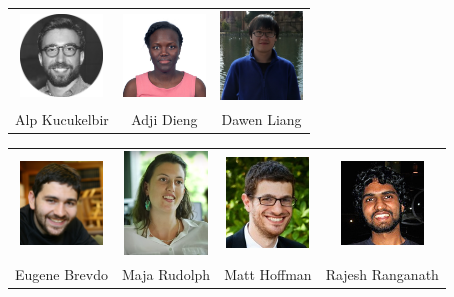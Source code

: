 \documentclass[10pt,
               xcolor={usenames,dvipsnames},
               hyperref={colorlinks,linktoc=all,citecolor=Plum,linkcolor=MidnightBlue,urlcolor=MidnightBlue},noamssymb]{beamer}
\begin{document}
\begin{frame}[plain]
\footnotesize
\begin{center}
\begin{tabular}{ccc}
\includegraphics[width=22mm]{img/alp.png} &
\includegraphics[width=22mm]{img/adji.jpg} &
\includegraphics[width=22mm]{img/dawen.jpg} \\
Alp Kucukelbir & Adji Dieng & Dawen Liang \\
\end{tabular}

\vspace{-2ex}

\begin{tabular}{cccc}
\includegraphics[width=22mm]{img/eugene.jpg} &
\includegraphics[width=22mm]{img/maja.png} &
\includegraphics[width=22mm]{img/matt.jpg} &
\includegraphics[width=22mm]{img/ranganath.jpg} \\
Eugene Brevdo & Maja Rudolph & Matt Hoffman & Rajesh Ranganath \\
\end{tabular}


\end{center}
\end{frame}
\end{document}
